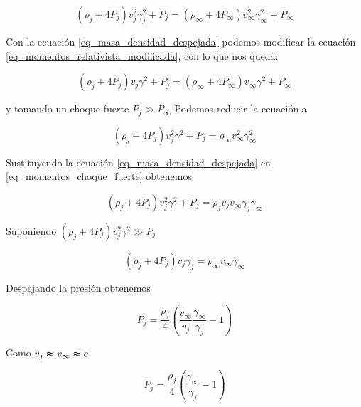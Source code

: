 \documentclass[12pt,a4paper]{book}
\begin{document}
\begin{equation} \label{eq_momentos_relativista_modificada}
  \left( \rho_j + 4P_j \right) v^2_j \gamma^2_j  +P_j = \left( \rho_\infty + 4P_\infty \right) v^2_{\infty} \gamma^2_{\infty}  +P_\infty
\end{equation}

Con la ecuación \ref{eq_masa_densidad_despejada} podemos modificar la ecuación \ref{eq_momentos_relativista_modificada}, con lo que nos queda:

\begin{equation}
  \left( \rho_j + 4P_j \right)v_j \gamma^2 +P_j = \left( \rho_\infty + 4P_\infty \right)v_\infty \gamma^2 +P_\infty
\end{equation}

y tomando un choque fuerte $P_j \gg P_\infty $ Podemos reducir la ecuación a 

\begin{equation} \label{eq_momentos_choque_fuerte}
  \left( \rho_j + 4P_j \right)v_j^2 \gamma^2 +P_j =  \rho_\infty  v_\infty^2 \gamma_{\infty}^{2} 
\end{equation}

Sustituyendo la ecuación \ref{eq_masa_densidad_despejada} en \ref{eq_momentos_choque_fuerte} obtenemos

\begin{equation} \label{eq_momentos_choque_fuerte}
  \left( \rho_j + 4P_j \right)v_j^2 \gamma^2 +P_j = \rho_j v_j v_\infty \gamma_j \gamma_\infty
\end{equation}

Suponiendo $\left( \rho_j + 4P_j \right)v_j^2 \gamma^2 \gg P_j $



\begin{equation}
  \left( \rho_j + 4P_j \right)v_j \gamma_j = \rho_\infty v_\infty  \gamma_\infty
\end{equation}

Despejando la presión obtenemos

\begin{equation}
  P_j = \frac{\rho_j}{4}\left(\frac{v_\infty}{v_j} \frac{\gamma_\infty}{\gamma_j}-1\right)
\end{equation}

Como $v_j \thickapprox v_\infty \thickapprox c$

\begin{equation}
  P_j = \frac{\rho_j}{4}\left( \frac{\gamma_\infty}{\gamma_j}-1\right)
\end{equation}
\end{document}
